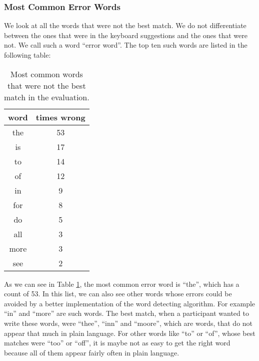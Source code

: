 \subsubsection{Most Common Error Words}
We look at all the words that were not the best match. We do not differentiate between the ones that were in the keyboard suggestions and the ones that were not. We call such a word ``error word''. The top ten such words are listed in the following table:
\begin{table}[H]
    \centering
    \caption{Most common words that were not the best match in the evaluation.}
    \begin{tabular}{cc} \toprule
        word&times wrong\\ \midrule
        the & 53\\
        is & 17\\
        to & 14\\
        of & 12\\
        in & 9\\
        for & 8\\
        do & 5\\
        all & 3\\
        more & 3\\
        see & 2\\
        \bottomrule
    \end{tabular}
    \label{tab:error_words}
\end{table}

As we can see in Table \ref{tab:error_words}, the most common error word is ``the'', which has a count of 53. In this list, we can also see other words whose errors could be avoided by a better implementation of the word detecting algorithm. For example ``in'' and ``more'' are such words. The best match, when a participant wanted to write these words, were ``thee'', ``inn'' and ``moore'', which are words, that do not appear that much in plain language. For other words like ``to'' or ``of'', whose best matches were ``too'' or ``off'', it is maybe not as easy to get the right word because all of them appear fairly often in plain language.

